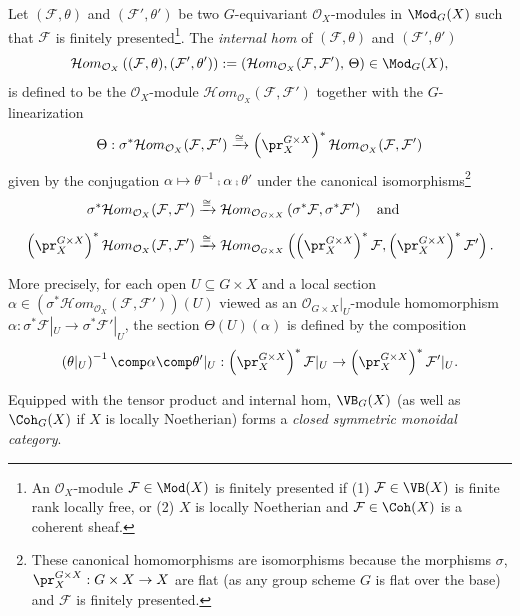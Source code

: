 \begin{defn}
\label{defn:InternalHomOfEquivariantModules}
Let $(\mathcal{F}, \theta)$ and $(\mathcal{F}', \theta')$ be two $G$-equivariant $\mathcal{O}_X$-modules in $\Mod_G(X)$
such that
$\mathcal{F}$ is finitely presented\footnote{
An $\mathcal{O}_X$-module $\mathcal{F}\in\Mod(X)$
is finitely presented if
(1)
$\mathcal{F}\in\VB(X)$ is finite rank locally free,
or
(2)
$X$ is locally Noetherian and $\mathcal{F}\in\Coh(X)$ is a coherent sheaf.
}.
The \emph{internal hom} of $(\mathcal{F}, \theta)$ and $(\mathcal{F}', \theta')$
$$
\mathcal{H}om_{\mathcal{O}_X}\left( (\mathcal{F}, \theta), (\mathcal{F}', \theta') \right)
:=
\left( \mathcal{H}om_{\mathcal{O}_X}(\mathcal{F}, \mathcal{F}'), \, \Theta \right)
\in
\Mod_G(X),
$$
is defined to be the $\mathcal{O}_X$-module $\mathcal{H}om_{\mathcal{O}_X}(\mathcal{F}, \mathcal{F}')$
together with the $G$-linearization
$$
\Theta
:
\sigma^*\mathcal{H}om_{\mathcal{O}_X}(\mathcal{F}, \mathcal{F}')
\xrightarrow{\cong}
\left(\pr_X^{G \times X}\right)^* \mathcal{H}om_{\mathcal{O}_X}(\mathcal{F}, \mathcal{F}')
$$
given by the conjugation
$
\alpha
\mapsto
\theta^{-1}
\comp
\alpha
\comp
\theta'
$
under the canonical isomorphisms\footnote{
These canonical homomorphisms are isomorphisms
because the morphisms
$\sigma$,
$\pr_X^{G\times X}
:
G \times X \rightarrow X$
are flat
(as any group scheme $G$ is flat over the base)
and $\mathcal{F}$ is finitely presented.
}
\begin{align*}
\sigma^* \mathcal{H}om_{\mathcal{O}_X}(\mathcal{F}, \mathcal{F}')
&\xrightarrow{\cong}
\mathcal{H}om_{\mathcal{O}_{G \times X}}\left(\sigma^* \mathcal{F}, \sigma^* \mathcal{F}'\right)
\quad\text{and}\quad
\\[2mm]
\left(\pr_X^{G \times X}\right)^* \mathcal{H}om_{\mathcal{O}_X}(\mathcal{F}, \mathcal{F}')
&\xrightarrow{\cong}
\mathcal{H}om_{\mathcal{O}_{G \times X}}\left(\left(\pr_X^{G \times X}\right)^*\mathcal{F}, \left(\pr_X^{G \times X}\right)^*\mathcal{F}'\right).
\end{align*}

More precisely, for each open $U \subseteq G \times X$ and a local section
$
\alpha \in \left(\sigma^*\mathcal{H}om_{\mathcal{O}_X}(\mathcal{F}, \mathcal{F}')\right)(U)
$
viewed as an $\mathcal{O}_{G\times X}|_U$-module homomorphism
$
\alpha : \sigma^*\mathcal{F}|_U \rightarrow \sigma^*\mathcal{F}'|_U
$,
the section $\Theta(U)(\alpha)$ is defined by the composition
$$
\left(\theta|_U\right)^{-1}
\comp
\alpha
\comp
\theta'|_U
:
\left(\pr_X^{G \times X}\right)^*\mathcal{F}|_U
\rightarrow
\left(\pr_X^{G \times X}\right)^*\mathcal{F}'|_U.
$$

Equipped with the tensor product and internal hom,
$\VB_G(X)$
(as well as $\Coh_G(X)$ if $X$ is locally Noetherian)
forms a \emph{closed symmetric monoidal category}.

\end{defn}
